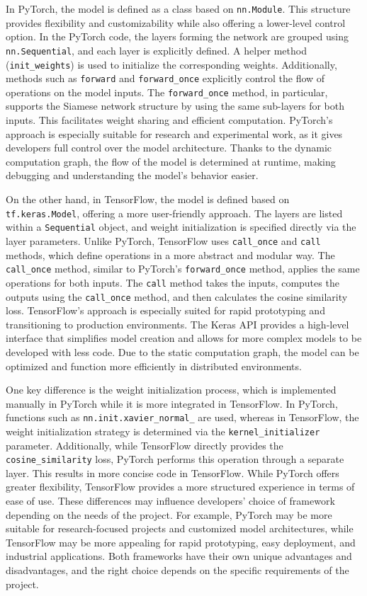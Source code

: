 \documentclass[conference]{IEEEtran}
\begin{document}
In PyTorch, the model is defined as a class based on \texttt{nn.Module}. This structure provides flexibility and customizability while also offering a lower-level control option. In the PyTorch code, the layers forming the network are grouped using \texttt{nn.Sequential}, and each layer is explicitly defined. A helper method (\texttt{init\_weights}) is used to initialize the corresponding weights. Additionally, methods such as \texttt{forward} and \texttt{forward\_once} explicitly control the flow of operations on the model inputs. The \texttt{forward\_once} method, in particular, supports the Siamese network structure by using the same sub-layers for both inputs. This facilitates weight sharing and efficient computation. PyTorch’s approach is especially suitable for research and experimental work, as it gives developers full control over the model architecture. Thanks to the dynamic computation graph, the flow of the model is determined at runtime, making debugging and understanding the model's behavior easier.

On the other hand, in TensorFlow, the model is defined based on \texttt{tf.keras.Model}, offering a more user-friendly approach. The layers are listed within a \texttt{Sequential} object, and weight initialization is specified directly via the layer parameters. Unlike PyTorch, TensorFlow uses \texttt{call\_once} and \texttt{call} methods, which define operations in a more abstract and modular way. The \texttt{call\_once} method, similar to PyTorch’s \texttt{forward\_once} method, applies the same operations for both inputs. The \texttt{call} method takes the inputs, computes the outputs using the \texttt{call\_once} method, and then calculates the cosine similarity loss. TensorFlow's approach is especially suited for rapid prototyping and transitioning to production environments. The Keras API provides a high-level interface that simplifies model creation and allows for more complex models to be developed with less code. Due to the static computation graph, the model can be optimized and function more efficiently in distributed environments.

One key difference is the weight initialization process, which is implemented manually in PyTorch while it is more integrated in TensorFlow. In PyTorch, functions such as \texttt{nn.init.xavier\_normal\_} are used, whereas in TensorFlow, the weight initialization strategy is determined via the \texttt{kernel\_initializer} parameter. Additionally, while TensorFlow directly provides the \texttt{cosine\_similarity} loss, PyTorch performs this operation through a separate layer. This results in more concise code in TensorFlow. While PyTorch offers greater flexibility, TensorFlow provides a more structured experience in terms of ease of use. These differences may influence developers' choice of framework depending on the needs of the project. For example, PyTorch may be more suitable for research-focused projects and customized model architectures, while TensorFlow may be more appealing for rapid prototyping, easy deployment, and industrial applications. Both frameworks have their own unique advantages and disadvantages, and the right choice depends on the specific requirements of the project.
\end{document}
